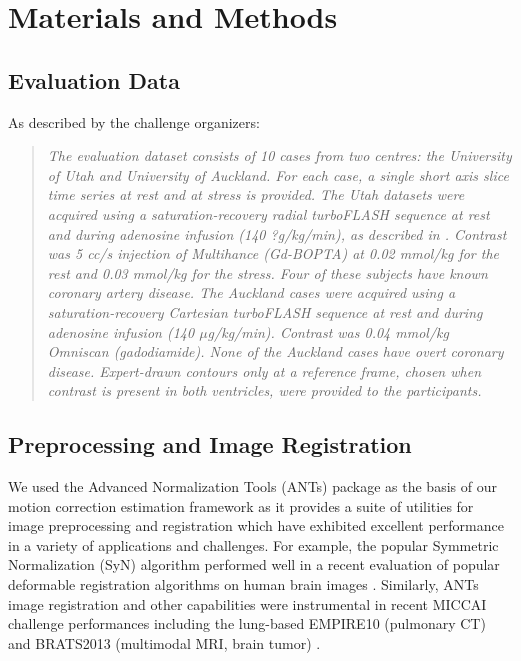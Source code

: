 \documentclass{llncs}
\begin{document}
\section{Materials and Methods}

\subsection{Evaluation Data}

As described by the challenge organizers:
\begin{quote}
{\it
The evaluation dataset consists of 10 cases from two centres: the University of Utah and University of Auckland. For each case, a single short axis slice time series at rest and at stress is provided. The Utah datasets were acquired using a saturation-recovery radial turboFLASH sequence at rest and during adenosine infusion (140 ?g/kg/min), as described in \cite{dibella2012}. Contrast was 5 cc/s injection of Multihance (Gd-BOPTA) at 0.02 mmol/kg for the rest and 0.03 mmol/kg for the stress. Four of these subjects have known coronary artery disease. The Auckland cases were acquired using a saturation-recovery Cartesian turboFLASH sequence at rest and during adenosine infusion (140 $\mu$g/kg/min). Contrast was 0.04 mmol/kg Omniscan (gadodiamide). None of the Auckland cases have overt coronary disease.  Expert-drawn contours only at a reference frame, chosen when contrast is present in both ventricles, were provided to the participants. 
}
\end{quote}

\subsection{Preprocessing and Image Registration}

We used the Advanced Normalization Tools (ANTs)
package as the basis of our motion correction estimation framework as it provides 
a suite of utilities for image preprocessing and registration which have exhibited 
excellent performance in a variety of applications and challenges.  For example, 
the popular Symmetric Normalization (SyN) algorithm \cite{avants2008,avants2011}
performed well in a recent evaluation of popular deformable registration 
algorithms on human brain images \cite{klein2009}.  Similarly, ANTs image registration and other 
capabilities were instrumental in recent MICCAI challenge performances including 
the lung-based EMPIRE10 (pulmonary CT) \cite{murphy2011} and BRATS2013 
(multimodal MRI, brain tumor) \cite{menze2014}.
\end{document}
